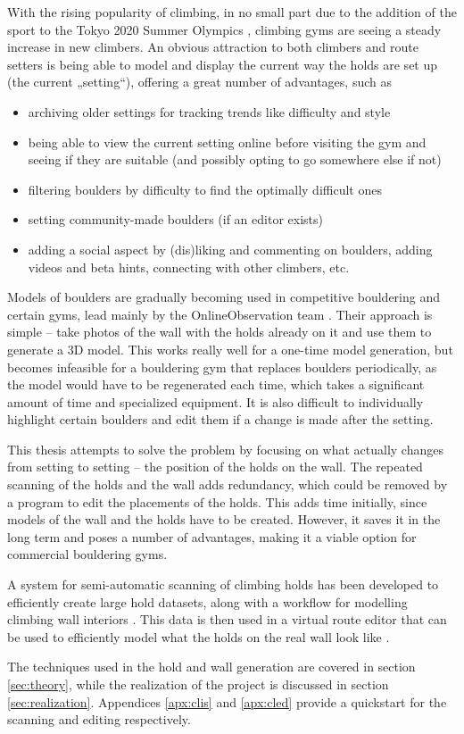 

With the rising popularity of climbing, in no small part due to the addition of the sport to the Tokyo 2020 Summer Olympics \cite{olympics}, climbing gyms are seeing a steady increase in new climbers.
An obvious attraction to both climbers and route setters is being able to model and display the current way the holds are set up (the current „setting“), offering a great number of advantages, such as

\begin{itemize}
	\item archiving older settings for tracking trends like difficulty and style
	\item being able to view the current setting online before visiting the gym and seeing if they are suitable (and possibly opting to go somewhere else if not)
	\item filtering boulders by difficulty to find the optimally difficult ones
	\item setting community-made boulders (if an editor exists)
	\item adding a social aspect by (dis)liking and commenting on boulders, adding videos and beta hints, connecting with other climbers, etc.
\end{itemize}

Models of boulders are gradually becoming used in competitive bouldering and certain gyms, lead mainly by the OnlineObservation team \cite{onlineobservation}.
Their approach is simple -- take photos of the wall with the holds already on it and use them to generate a 3D model.
This works really well for a one-time model generation, but becomes infeasible for a bouldering gym that replaces boulders periodically, as the model would have to be regenerated each time, which takes a significant amount of time and specialized equipment.
It is also difficult to individually highlight certain boulders and edit them if a change is made after the setting.

This thesis attempts to solve the problem by focusing on what actually changes from setting to setting -- the position of the holds on the wall.
The repeated scanning of the holds and the wall adds redundancy, which could be removed by a program to edit the placements of the holds.
This adds time initially, since models of the wall and the holds have to be created.
However, it saves it in the long term and poses a number of advantages, making it a viable option for commercial bouldering gyms.

A system for semi-automatic scanning of climbing holds has been developed to efficiently create large hold datasets, along with a workflow for modelling climbing wall interiors \cite{clis}.
This data is then used in a virtual route editor that can be used to efficiently model what the holds on the real wall look like \cite{cled}.

The techniques used in the hold and wall generation are covered in section \ref{sec:theory}, while the realization of the project is discussed in section \ref{sec:realization}.
Appendices \ref{apx:clis} and \ref{apx:cled} provide a quickstart for the scanning and editing respectively.
